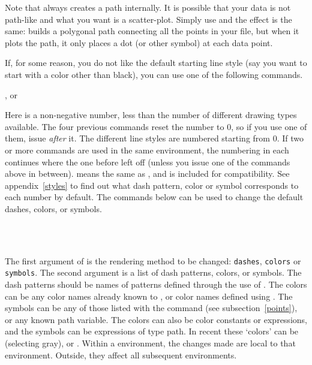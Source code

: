 \documentclass[letterpaper]{article}
\begin{document}
Note that \mfp{} always creates a path internally. It is possible that
your data is not path-like and what you want is a scatter-plot. Simply
use  and the effect is the same: \MP{} builds a
polygonal path connecting all the points in your file, but when it plots
the path, it only places a dot (or other symbol) at each data point.

If, for some reason, you do not like the default starting line style
(say you want to start with a color other than black), you can use one
of the following commands.

\begin{cd}
, or\\
%
%
\end{cd}

Here  is a non-negative number, less than the number of
different drawing types available. The four previous commands reset the
number to 0, so if you use one of them, issue 
\emph{after} it. The different line styles are numbered starting from
$0$. If two or more  commands are used in the same
 environment, the numbering in each continues where the one
before left off (unless you issue one of the commands above in between).
 means the same as , and is included
for compatibility. See appendix~\ref{styles} to find out what dash pattern,
color or symbol corresponds to each number by default. The commands
below can be used to change the default dashes,  colors, or symbols.

\begin{cd}
\\
\\
%
\end{cd}

The first argument of  is the rendering method to be
changed: \texttt{dashes}, \texttt{colors} or \texttt{symbols}. The
second argument is a list of dash patterns, colors, or symbols. The dash
patterns should be names of patterns defined through the use of
. The colors can be any color names already known to
\MP{}, or color names defined using .
The symbols can be any of those listed with the  command
(see subsection~\ref{points}), or any known \MF{} path variable. The
colors can also be \MP{} color constants or expressions, and the symbols
can be expressions of type path. In recent \MP{} these `colors' can be
 (selecting gray),  or . Within a
 environment, the changes made are local to that environment.
Outside, they affect all subsequent environments.
\end{document}
